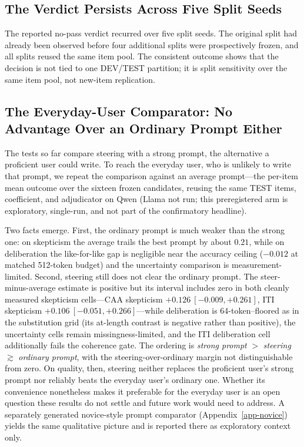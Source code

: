 \documentclass[manuscript,review,anonymous]{acmart}
\begin{document}
\subsection{The Verdict Persists Across Five Split Seeds}\label{the-verdict-persists-across-five-split-seeds}

The reported no-pass verdict recurred over five split seeds. {}%
The original split had already been observed before four additional splits were prospectively frozen, and all splits reused the same item pool. {}%
The consistent outcome shows that the decision is not tied to one DEV/TEST partition; it is split sensitivity over the same item pool, not new-item replication.

\subsection{The Everyday-User Comparator: No Advantage Over an Ordinary Prompt Either}\label{everyday-user-comparator}

The tests so far compare steering with a strong prompt, the alternative a proficient user could write. To reach the everyday user, who is unlikely to write that prompt, we repeat the comparison against an average prompt---the per-item mean outcome over the sixteen frozen candidates, reusing the same TEST items, coefficient, and adjudicator on Qwen (Llama not run; this preregistered arm is exploratory, single-run, and not part of the confirmatory headline).

Two facts emerge. First, the ordinary prompt is much weaker than the strong one: on skepticism the average trails the best prompt by about \(0.21\), while on deliberation the like-for-like gap is negligible near the accuracy ceiling (\(-0.012\) at matched 512-token budget) and the uncertainty comparison is measurement-limited. Second, steering still does not clear the ordinary prompt. The steer-minus-average estimate is positive but its interval includes zero in both cleanly measured skepticism cells---CAA skepticism \(+0.126\ [-0.009,+0.261]\), ITI skepticism \(+0.106\ [-0.051,+0.266]\)---while deliberation is 64-token--floored as in the substitution grid (its at-length contrast is negative rather than positive), the uncertainty cells remain missingness-limited, and the ITI deliberation cell additionally fails the coherence gate. The ordering is \emph{strong prompt} \(>\) \emph{steering} \(\gtrsim\) \emph{ordinary prompt}, with the steering-over-ordinary margin not distinguishable from zero. On quality, then, steering neither replaces the proficient user's strong prompt nor reliably beats the everyday user's ordinary one. Whether its convenience nonetheless makes it preferable for the everyday user is an open question these results do not settle and future work would need to address. A separately generated novice-style prompt comparator (Appendix~\ref{app-novice}) yields the same qualitative picture and is reported there as exploratory context only. {}%
\end{document}
